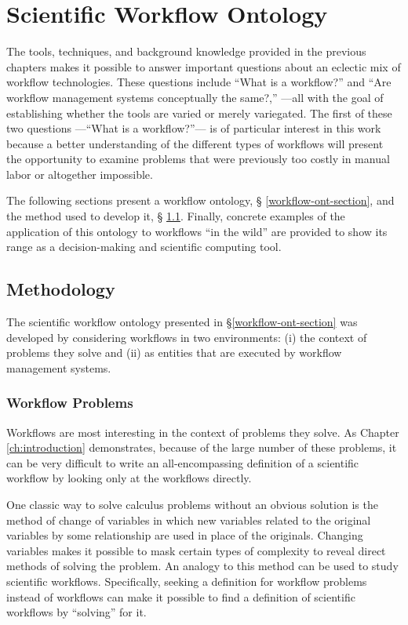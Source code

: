 \chapter{Scientific Workflow Ontology}
\label{ch:workflow-ontology}

The tools, techniques, and background knowledge provided in the previous
chapters makes it possible to answer important questions about an eclectic mix
of workflow technologies. These questions include ``What is a workflow?'' and
``Are workflow management systems conceptually the same?,'' ---all with the goal
of establishing whether the tools are varied or merely variegated. The first of
these two questions ---``What is a workflow?''--- is of particular interest in
this work because a better understanding of the different types of workflows will
present the opportunity to examine problems that were previously too costly in
manual labor or altogether impossible.

The following sections present a workflow ontology, \S
\ref{workflow-ont-section}, and the method used to develop it, \S
\ref{workflow-ont-method}. Finally, concrete examples of the application of this
ontology to workflows ``in the wild'' are provided to show its range as a
decision-making and scientific computing tool.

\section{Methodology}
\label{workflow-ont-method}

The scientific workflow ontology presented in \S \ref{workflow-ont-section} was
developed by considering workflows in two environments: (i) the context
of problems they solve and (ii) as entities that are executed by workflow
management systems.

\subsection{Workflow Problems}

Workflows are most interesting in the context of problems they solve. As
Chapter \ref{ch:introduction} demonstrates, because of the large number of these
problems, it can be very difficult to write an all-encompassing
definition of a scientific workflow by looking only at the workflows directly. 

One classic way to solve calculus problems without an obvious solution is the
method of change of variables in which new variables related to the original
variables by some relationship are used in place of the originals. Changing
variables makes it possible to mask certain types of complexity to reveal direct
methods of solving the problem. An analogy to this method can be used to study
scientific workflows. Specifically, seeking a definition for workflow problems
instead of workflows can make it possible to find a definition of scientific
workflows by ``solving'' for it. 

